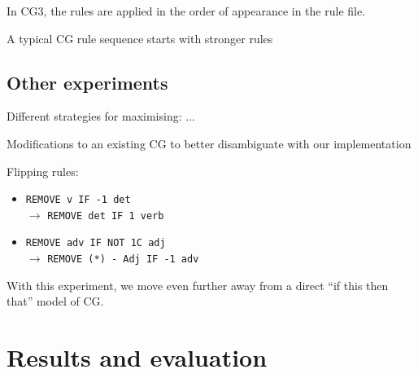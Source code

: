 \documentclass[11pt]{article}
\begin{document}

In CG3, the rules are applied in the order of appearance in the rule file.

A typical CG rule sequence starts with stronger rules  

\subsection{Other experiments}

Different strategies for maximising: ...

Modifications to an existing CG to better disambiguate with our implementation

Flipping rules: 
\begin{itemize}
\item [] \texttt{REMOVE v IF -1 det} \\ $\rightarrow$ \texttt{REMOVE det IF 1 verb}   
\item [] \texttt{REMOVE adv IF NOT 1C adj} \\ $\rightarrow$ \texttt{REMOVE (*) - Adj  IF -1 adv}  \\
\end{itemize}

With this experiment, we move even further away from a direct ``if this then that'' model of CG.

\section{Results and evaluation}







\end{document}
